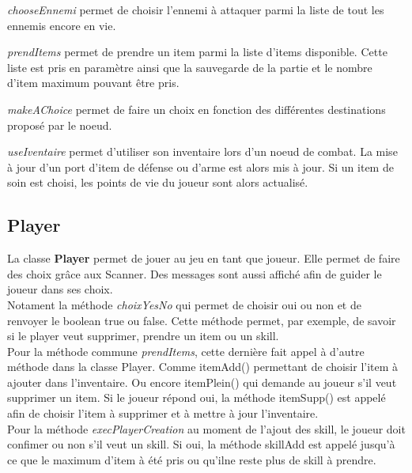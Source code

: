		\textit{chooseEnnemi} permet de choisir l'ennemi à attaquer parmi la liste de tout les ennemis encore en vie.

		\textit{prendItems} permet de prendre un item parmi la liste d'items disponible. Cette liste est pris en paramètre ainsi que la sauvegarde de la partie et le nombre d'item maximum pouvant être pris.

		\textit{makeAChoice} permet de faire un choix en fonction des différentes destinations proposé par le noeud.

		\textit{useIventaire} permet d'utiliser son inventaire lors d'un noeud de combat. La mise à jour d'un port d'item de défense ou d'arme est alors mis à jour. Si un item de soin est choisi, les points de vie du joueur sont alors actualisé.

	\subsection{Player}
		La classe \textbf{Player} permet de jouer au jeu en tant que joueur. Elle permet de faire des choix grâce aux Scanner. Des messages sont aussi affiché afin de guider le joueur dans ses choix.\\
		Notament la méthode \textit{choixYesNo} qui permet de choisir oui ou non et de renvoyer le boolean true ou false. Cette méthode permet, par exemple, de savoir si le player veut supprimer, prendre un item ou un skill.\\
		Pour la méthode commune \textit{prendItems}, cette dernière fait appel à d'autre méthode dans la classe Player. Comme itemAdd() permettant de choisir l'item à ajouter dans l'inventaire. Ou encore itemPlein() qui demande au joueur s'il veut supprimer un item. Si le joueur répond oui, la méthode itemSupp() est appelé afin de choisir l'item à supprimer et à mettre à jour l'inventaire.\\
		Pour la méthode \textit{execPlayerCreation} au moment de l'ajout des skill, le joueur doit confimer ou non s'il veut un skill. Si oui, la méthode skillAdd est appelé jusqu'à ce que le maximum d'item à été pris ou qu'ilne reste plus de skill à prendre.

